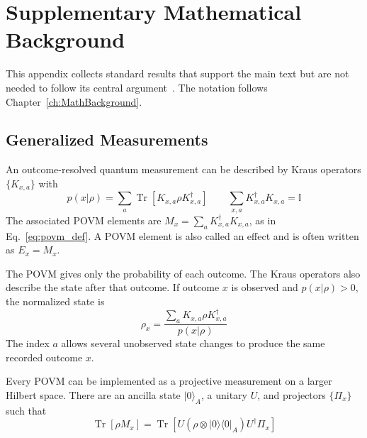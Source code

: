 \chapter{Supplementary Mathematical Background}
\label{app:mathematical_background}

This appendix collects standard results that support the main text but are not needed to follow its central argument~\cite{nielsen_chuang_2010_quantum_computation_and_quantum_information,quantum_theory_from_first_principles}.  The notation follows Chapter~\ref{ch:MathBackground}.

\section{Generalized Measurements}

\begin{definition}
    An outcome-resolved quantum measurement can be described by Kraus operators $\{K_{x,a}\}$ with
    \begin{equation}
        p(x|\rho)=\sum_a\operatorname{Tr}\!\left[K_{x,a}\rho K_{x,a}^\dagger\right]
        \qquad
        \sum_{x,a}K_{x,a}^\dagger K_{x,a}=\mathbb{I}
    \end{equation}
    The associated POVM elements are $M_x=\sum_aK_{x,a}^\dagger K_{x,a}$, as in Eq.~\eqref{eq:povm_def}.  A POVM element is also called an effect and is often written as $E_x=M_x$.

    The POVM gives only the probability of each outcome.  The Kraus operators also describe the state after that outcome.  If outcome $x$ is observed and $p(x|\rho)>0$, the normalized state is
    \begin{equation}
        \rho_x
        =\frac{\sum_aK_{x,a}\rho K_{x,a}^\dagger}{p(x|\rho)}
    \end{equation}
    The index $a$ allows several unobserved state changes to produce the same recorded outcome $x$.
\end{definition}

\begin{theorem}
    Every POVM can be implemented as a projective measurement on a larger Hilbert space.  There are an ancilla state $|0\rangle_A$, a unitary $U$, and projectors $\{\Pi_x\}$ such that
    \begin{equation}
        \operatorname{Tr}[\rho M_x]
        =\operatorname{Tr}\!\left[
            U(\rho\otimes|0\rangle\langle0|_A)U^\dagger\Pi_x
            \right]
        \label{eq:naimark_dilation}
    \end{equation}
\end{theorem}

